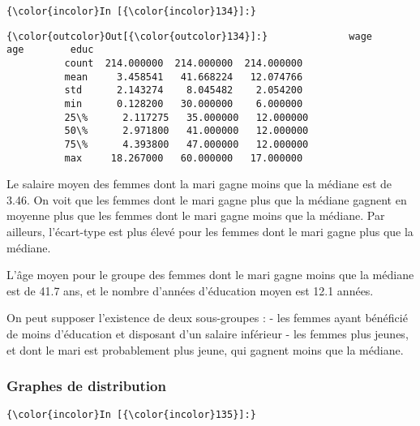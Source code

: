 \documentclass[11pt]{article}
\begin{document}
    \begin{Verbatim}[commandchars=\\\{\}]
{\color{incolor}In [{\color{incolor}134}]:} 
\end{Verbatim}


\begin{Verbatim}[commandchars=\\\{\}]
{\color{outcolor}Out[{\color{outcolor}134}]:}              wage         age        educ
          count  214.000000  214.000000  214.000000
          mean     3.458541   41.668224   12.074766
          std      2.143274    8.045482    2.054200
          min      0.128200   30.000000    6.000000
          25\%      2.117275   35.000000   12.000000
          50\%      2.971800   41.000000   12.000000
          75\%      4.393800   47.000000   12.000000
          max     18.267000   60.000000   17.000000
\end{Verbatim}
            
    Le salaire moyen des femmes dont la mari gagne moins que la médiane est
de 3.46. On voit que les femmes dont le mari gagne plus que la médiane
gagnent en moyenne plus que les femmes dont le mari gagne moins que la
médiane. Par ailleurs, l'écart-type est plus élevé pour les femmes dont
le mari gagne plus que la médiane.

L'âge moyen pour le groupe des femmes dont le mari gagne moins que la
médiane est de 41.7 ans, et le nombre d'années d'éducation moyen est
12.1 années.

On peut supposer l'existence de deux sous-groupes : - les femmes ayant
bénéficié de moins d'éducation et disposant d'un salaire inférieur - les
femmes plus jeunes, et dont le mari est probablement plus jeune, qui
gagnent moins que la médiane.

    \subsubsection{Graphes de distribution}\label{graphes-de-distribution}

    \begin{Verbatim}[commandchars=\\\{\}]
{\color{incolor}In [{\color{incolor}135}]:} 
\end{Verbatim}


    \begin{center}
    \end{center}
    { \hspace*{\fill} \\}
    
\end{document}
